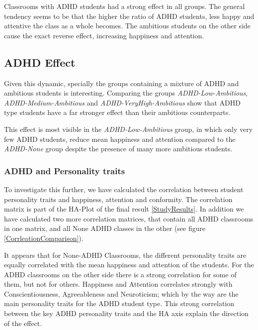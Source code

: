 Classrooms with ADHD students had a strong effect in all groups. The general
tendency seems to be that the higher the ratio of ADHD students, less happy and
attentive the class as a whole becomes. The ambitious students on the other
side cause the exact reverse effect, increasing happiness and attention.

\subsection{ADHD Effect}
Given this dynamic, specially the groups containing a mixture of ADHD and
ambitious students is interesting. Comparing the groups \textit{ADHD-Low-Ambitious},
\textit{ADHD-Medium-Ambitious} and \textit{ADHD-VeryHigh-Ambitious} show that ADHD
type students have a far stronger effect than their ambitious counterparts.

\bb

This effect is most visible in the \textit{ADHD-Low-Ambitious} group, in which only
very few ADHD students, reduce mean happiness and attention compared to the \textit{ADHD-None}
group despite the presence of many more ambitious students.

\bb

\subsubsection{ADHD and Personality traits}
To investigate this further, we have calculated the correlation between student personality
traits and happiness, attention and conformity. The correlation matrix is part
of the HA-Plot of the final result \ref{StudyResults}. In addition we have calculated
two more correlation matrices, that contain all ADHD classrooms in one matrix, and
all None ADHD classes in the other (see figure \ref{CorrleationComparison}).

\bb

It appears that for None-ADHD Classrooms, the different personality traits are equally
correlated with the mean happiness and attention of the students. For the ADHD
classrooms on the other side there is a strong correlation for some of them, but not
for others. Happiness and Attention correlates strongly with Conscientiousness, Agreeableness
and Neuroticism; which by the way are the main personality traits for the ADHD student
type. This strong correlation between the key ADHD personality traits and the HA
axis explain the direction of the effect.

\bb


